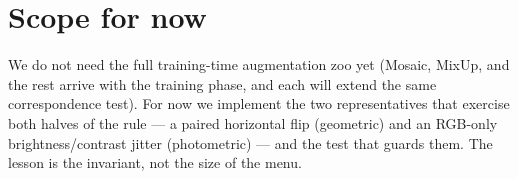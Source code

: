 \documentclass[../main.tex]{subfiles}
\begin{document}
\section{Scope for now}

We do not need the full training-time augmentation zoo yet (Mosaic, MixUp, and the rest arrive
with the training phase, and each will extend the same correspondence test). For now we implement
the two representatives that exercise both halves of the rule --- a paired horizontal flip
(geometric) and an RGB-only brightness/contrast jitter (photometric) --- and the test that guards
them. The lesson is the invariant, not the size of the menu.
\end{document}
